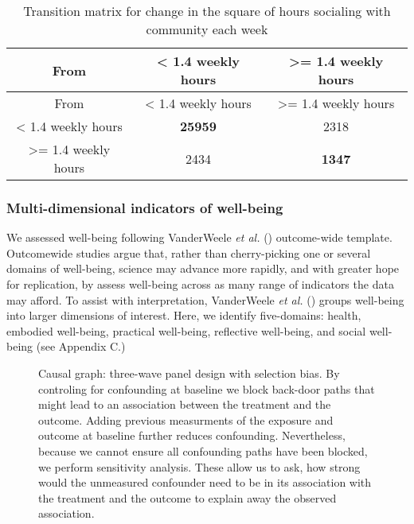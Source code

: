 \documentclass[
  singlecolumn]{article}
\begin{document}
\begin{longtable}[]{@{}ccc@{}}
\caption{Transition matrix for change in the square of hours socialing
with community each
week}\label{tbl-transition-socialising-shift}\tabularnewline
\toprule\noalign{}
From & \textless{} 1.4 weekly hours & \textgreater= 1.4 weekly hours \\
\midrule\noalign{}
\endfirsthead
\toprule\noalign{}
From & \textless{} 1.4 weekly hours & \textgreater= 1.4 weekly hours \\
\midrule\noalign{}
\endhead
\bottomrule\noalign{}
\endlastfoot
\textless{} 1.4 weekly hours & \textbf{25959} & 2318 \\
\textgreater= 1.4 weekly hours & 2434 & \textbf{1347} \\
\end{longtable}

\subsubsection{Multi-dimensional indicators of
well-being}\label{multi-dimensional-indicators-of-well-being}

We assessed well-being following VanderWeele \emph{et al.}
() outcome-wide template.
Outcomewide studies argue that, rather than cherry-picking one or
several domains of well-being, science may advance more rapidly, and
with greater hope for replication, by assess well-being across as many
range of indicators the data may afford. To assist with interpretation,
VanderWeele \emph{et al.} () groups
well-being into larger dimensions of interest. Here, we identify
five-domains: health, embodied well-being, practical well-being,
reflective well-being, and social well-being (see Appendix C.)

\newpage{}

\begin{figure}


\caption{\label{fig-outcomewide-dag}Causal graph: three-wave panel
design with selection bias. By controling for confounding at baseline we
block back-door paths that might lead to an association between the
treatment and the outcome. Adding previous measurments of the exposure
and outcome at baseline further reduces confounding. Nevertheless,
because we cannot ensure all confounding paths have been blocked, we
perform sensitivity analysis. These allow us to ask, how strong would
the unmeasured confounder need to be in its association with the
treatment and the outcome to explain away the observed association.}

\end{figure}%
\end{document}
